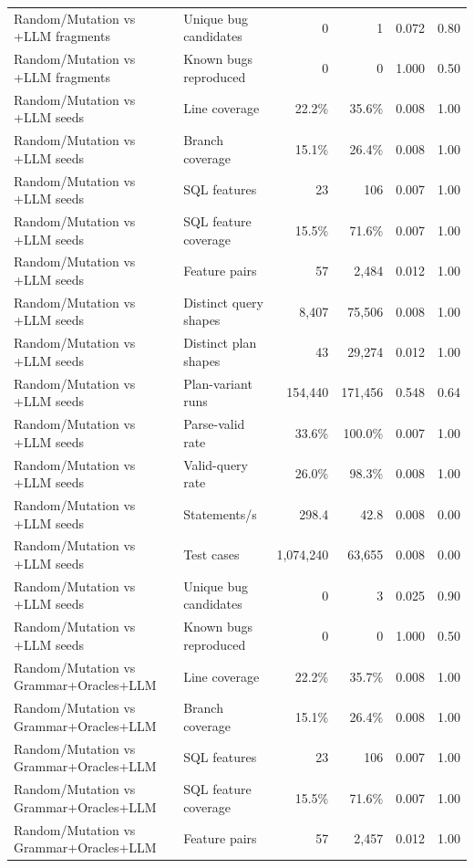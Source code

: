 \begin{table}[t]
\begin{tabular}{llrrrr}
    Random/Mutation vs +LLM fragments & Unique bug candidates & 0 & 1 & 0.072 & 0.80 \\
    Random/Mutation vs +LLM fragments & Known bugs reproduced & 0 & 0 & 1.000 & 0.50 \\
    Random/Mutation vs +LLM seeds & Line coverage & 22.2\% & 35.6\% & 0.008 & 1.00 \\
    Random/Mutation vs +LLM seeds & Branch coverage & 15.1\% & 26.4\% & 0.008 & 1.00 \\
    Random/Mutation vs +LLM seeds & SQL features & 23 & 106 & 0.007 & 1.00 \\
    Random/Mutation vs +LLM seeds & SQL feature coverage & 15.5\% & 71.6\% & 0.007 & 1.00 \\
    Random/Mutation vs +LLM seeds & Feature pairs & 57 & 2{,}484 & 0.012 & 1.00 \\
    Random/Mutation vs +LLM seeds & Distinct query shapes & 8{,}407 & 75{,}506 & 0.008 & 1.00 \\
    Random/Mutation vs +LLM seeds & Distinct plan shapes & 43 & 29{,}274 & 0.012 & 1.00 \\
    Random/Mutation vs +LLM seeds & Plan-variant runs & 154{,}440 & 171{,}456 & 0.548 & 0.64 \\
    Random/Mutation vs +LLM seeds & Parse-valid rate & 33.6\% & 100.0\% & 0.007 & 1.00 \\
    Random/Mutation vs +LLM seeds & Valid-query rate & 26.0\% & 98.3\% & 0.008 & 1.00 \\
    Random/Mutation vs +LLM seeds & Statements/s & 298.4 & 42.8 & 0.008 & 0.00 \\
    Random/Mutation vs +LLM seeds & Test cases & 1{,}074{,}240 & 63{,}655 & 0.008 & 0.00 \\
    Random/Mutation vs +LLM seeds & Unique bug candidates & 0 & 3 & 0.025 & 0.90 \\
    Random/Mutation vs +LLM seeds & Known bugs reproduced & 0 & 0 & 1.000 & 0.50 \\
    Random/Mutation vs Grammar+Oracles+LLM & Line coverage & 22.2\% & 35.7\% & 0.008 & 1.00 \\
    Random/Mutation vs Grammar+Oracles+LLM & Branch coverage & 15.1\% & 26.4\% & 0.008 & 1.00 \\
    Random/Mutation vs Grammar+Oracles+LLM & SQL features & 23 & 106 & 0.007 & 1.00 \\
    Random/Mutation vs Grammar+Oracles+LLM & SQL feature coverage & 15.5\% & 71.6\% & 0.007 & 1.00 \\
    Random/Mutation vs Grammar+Oracles+LLM & Feature pairs & 57 & 2{,}457 & 0.012 & 1.00 \\

\end{tabular}
\end{table}
